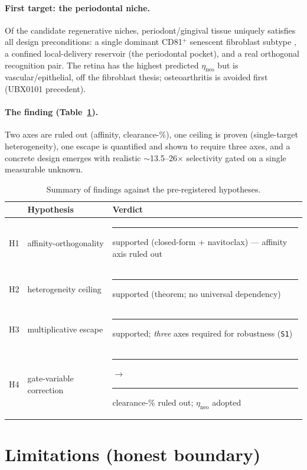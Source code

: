 \documentclass[11pt,a4paper]{article}
\newcommand{\tierdisc}[1]{\textcolor{#1}{\rule[0.05ex]{1.0ex}{1.0ex}}}
\newcommand{\tierBlue}{\tierdisc{blue!70!black}}
\newcommand{\tierGreen}{\tierdisc{green!60!black}}
\newcommand{\tierRed}{\tierdisc{red!80!black}}
\begin{document}
\paragraph{First target: the periodontal niche.}
Of the candidate regenerative niches, periodont/gingival tissue uniquely
satisfies all design preconditions: a single dominant CD81$^+$ senescent
fibroblast subtype \citep{perio2024}, a confined local-delivery reservoir (the
periodontal pocket), and a real orthogonal recognition pair. The retina has the
highest predicted $\eta_{\mathrm{neo}}$ but is vascular/epithelial, off the
fibroblast thesis; osteoarthritis is avoided first (UBX0101 precedent).

\paragraph{The finding (Table~\ref{tab:findings}).}
Two axes are ruled out (affinity, clearance-\%), one ceiling is proven
(single-target heterogeneity), one escape is quantified and shown to require
three axes, and a concrete design emerges with realistic
$\sim$13.5--26$\times$ selectivity gated on a single measurable unknown.

\begin{table}[h]
\centering
\caption{Summary of findings against the pre-registered hypotheses.}
\label{tab:findings}
\small
\begin{tabular}{@{}llp{7.4cm}@{}}
\toprule
& Hypothesis & Verdict \\
\midrule
H1 & affinity-orthogonality & \tierBlue{} supported (closed-form + navitoclax) --- affinity axis ruled out \\
H2 & heterogeneity ceiling & \tierBlue{} supported (theorem; no universal dependency) \\
H3 & multiplicative escape & \tierGreen{} supported; \emph{three} axes required for robustness (\texttt{S1}) \\
H4 & gate-variable correction & \tierRed{}$\to$\tierGreen{} clearance-\% ruled out; $\eta_{\mathrm{neo}}$ adopted \\
\bottomrule
\end{tabular}
\end{table}

\section{Limitations (honest boundary)}
\label{sec:limits}
\end{document}
